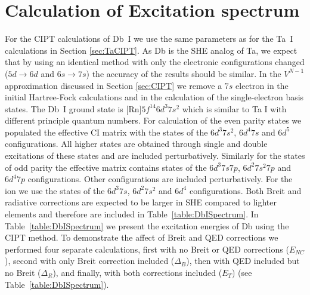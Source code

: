 \documentclass[10pt,a4paper, twoside, openright]{report}
\begin{document}
\section{Calculation of Excitation spectrum}
For the CIPT calculations of Db~I we use the same parameters as for the Ta~I calculations in Section \ref{sec:TaCIPT}. As Db is the SHE analog of Ta, we expect that by using an identical method with only the electronic configurations changed ($5d \rightarrow 6d$ and $6s \rightarrow 7s$) the accuracy of the results should be similar. In the $V^{N-1}$ approximation discussed in Section \ref{sec:CIPT} we remove a $7s$ electron in the initial Hartree-Fock calculations and in the calculation of the single-electron basis states. The Db~I ground state is [Rn]$5f^{14}6d^3 7s^2$ which is similar to Ta I with different principle quantum numbers. For calculation of the even parity states we populated the effective CI matrix with the states of the $6d^3 7s^2$,  $6d^4 7s$ and $6d^5$ configurations. All higher states are obtained through single and double excitations of these states and are included perturbatively. Similarly for  the states of odd parity the effective matrix contains states of the  $6d^3 7s 7p$, $6d^2 7s^2 7p$ and $6d^4 7p$ configurations. Other configurations are included perturbatively. For the ion  we use the states of the $6d^3 7s$, $6d^2 7s^2$ and $6d^4$ configurations.  Both Breit and radiative corrections are expected to be larger in SHE compared to lighter elements and therefore are included in Table~\ref{table:DbISpectrum}. In Table~\ref{table:DbISpectrum} we present the excitation energies of Db using the CIPT method. To demonstrate the affect of  Breit and QED corrections we performed four separate calculations,
first with no Breit or QED corrections ($E_{NC}$), second with only Breit correction included ($\Delta_{B}$), then with QED included but no Breit ($\Delta_{R}$), and finally,
with both corrections included ($E_T$) (see Table~\ref{table:DbISpectrum}).
\end{document}
